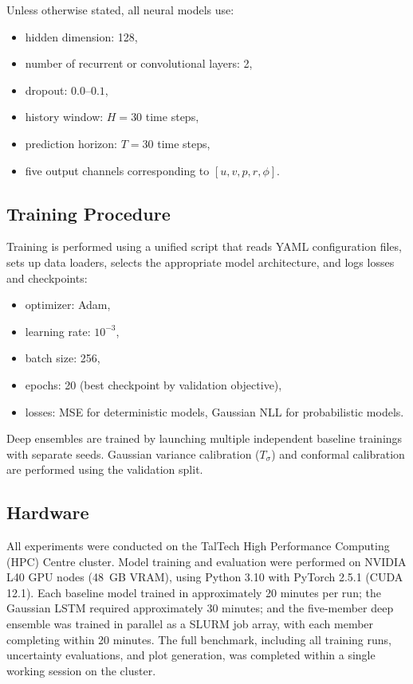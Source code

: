 \documentclass[a4paper,fleqn]{cas-sc}
\begin{document}
Unless otherwise stated, all neural models use:
\begin{itemize}
    \item hidden dimension: 128,
    \item number of recurrent or convolutional layers: 2,
    \item dropout: \(0.0\)–\(0.1\),
    \item history window: \(H=30\) time steps,
    \item prediction horizon: \(T=30\) time steps,
    \item five output channels corresponding to \([u, v, p, r, \phi]\).
\end{itemize}

\subsection{Training Procedure}

Training is performed using a unified script that reads YAML configuration files, sets up data loaders, selects the appropriate model architecture, and logs losses and checkpoints:
\begin{itemize}
    \item optimizer: Adam,
    \item learning rate: \(10^{-3}\),
    \item batch size: 256,
    \item epochs: 20 (best checkpoint by validation objective),
    \item losses: MSE for deterministic models, Gaussian NLL for probabilistic models.
\end{itemize}

Deep ensembles are trained by launching multiple independent baseline trainings with separate seeds. Gaussian variance calibration (\(T_\sigma\)) and conformal calibration are performed using the validation split.

\subsection{Hardware}

All experiments were conducted on the TalTech High Performance Computing (HPC) Centre cluster. Model training and evaluation were performed on NVIDIA L40 GPU nodes (48~GB VRAM), using Python 3.10 with PyTorch 2.5.1 (CUDA 12.1). Each baseline model trained in approximately 20 minutes per run; the Gaussian LSTM required approximately 30 minutes; and the five-member deep ensemble was trained in parallel as a SLURM job array, with each member completing within 20 minutes. The full benchmark, including all training runs, uncertainty evaluations, and plot generation, was completed within a single working session on the cluster.
\end{document}
